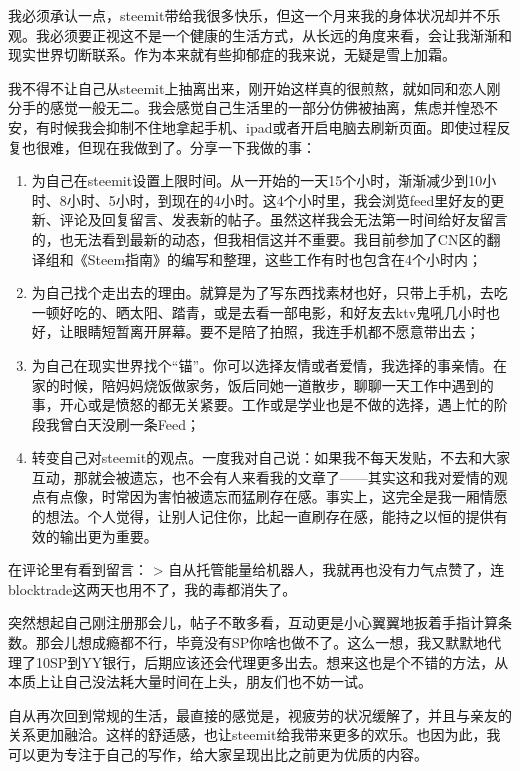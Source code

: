 \documentclass[]{ctexbook}
\begin{document}
我必须承认一点，steemit带给我很多快乐，但这一个月来我的身体状况却并不乐观。我必须要正视这不是一个健康的生活方式，从长远的角度来看，会让我渐渐和现实世界切断联系。作为本来就有些抑郁症的我来说，无疑是雪上加霜。

我不得不让自己从steemit上抽离出来，刚开始这样真的很煎熬，就如同和恋人刚分手的感觉一般无二。我会感觉自己生活里的一部分仿佛被抽离，焦虑并惶恐不安，有时候我会抑制不住地拿起手机、ipad或者开启电脑去刷新页面。即使过程反复也很难，但现在我做到了。分享一下我做的事：

\begin{enumerate}
\def\labelenumi{\arabic{enumi}.}
\item
  为自己在steemit设置上限时间。从一开始的一天15个小时，渐渐减少到10小时、8小时、5小时，到现在的4小时。这4个小时里，我会浏览feed里好友的更新、评论及回复留言、发表新的帖子。虽然这样我会无法第一时间给好友留言的，也无法看到最新的动态，但我相信这并不重要。我目前参加了CN区的翻译组和《Steem指南》的编写和整理，这些工作有时也包含在4个小时内；
\item
  为自己找个走出去的理由。就算是为了写东西找素材也好，只带上手机，去吃一顿好吃的、晒太阳、踏青，或是去看一部电影，和好友去ktv鬼吼几小时也好，让眼睛短暂离开屏幕。要不是陪了拍照，我连手机都不愿意带出去；
\item
  为自己在现实世界找个``锚''。你可以选择友情或者爱情，我选择的事亲情。在家的时候，陪妈妈烧饭做家务，饭后同她一道散步，聊聊一天工作中遇到的事，开心或是愤怒的都无关紧要。工作或是学业也是不做的选择，遇上忙的阶段我曾白天没刷一条Feed；
\item
  转变自己对steemit的观点。一度我对自己说：如果我不每天发贴，不去和大家互动，那就会被遗忘，也不会有人来看我的文章了------其实这和我对爱情的观点有点像，时常因为害怕被遗忘而猛刷存在感。事实上，这完全是我一厢情愿的想法。个人觉得，让别人记住你，比起一直刷存在感，能持之以恒的提供有效的输出更为重要。
\end{enumerate}

在评论里有看到留言：
\textgreater{} 自从托管能量给机器人，我就再也没有力气点赞了，连blocktrade这两天也用不了，我的毒都消失了。

突然想起自己刚注册那会儿，帖子不敢多看，互动更是小心翼翼地扳着手指计算条数。那会儿想成瘾都不行，毕竟没有SP你啥也做不了。这么一想，我又默默地代理了10SP到YY银行，后期应该还会代理更多出去。想来这也是个不错的方法，从本质上让自己没法耗大量时间在上头，朋友们也不妨一试。

自从再次回到常规的生活，最直接的感觉是，视疲劳的状况缓解了，并且与亲友的关系更加融洽。这样的舒适感，也让steemit给我带来更多的欢乐。也因为此，我可以更为专注于自己的写作，给大家呈现出比之前更为优质的内容。
\end{document}
